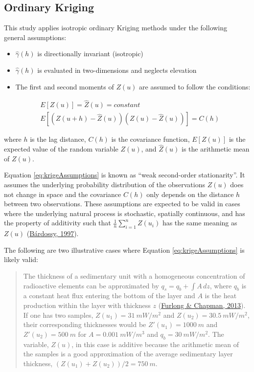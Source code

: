 \hypertarget{ordinary-kriging}{%
\subsection{Ordinary Kriging}\label{ordinary-kriging}}

This study applies isotropic ordinary Kriging methods under the following general assumptions:

\begin{itemize}
\tightlist
\item
  \(\hat{\gamma}(h)\) is directionally invariant (isotropic)
\item
  \(\hat{\gamma}(h)\) is evaluated in two-dimensions and neglects elevation
\item
  The first and second moments of \(Z(u)\) are assumed to follow the conditions:
\end{itemize}

\begin{equation}
  \begin{aligned}
    &E[Z(u)] = \hat{Z}(u) = constant \\
    &E[(Z(u + h) - \hat{Z}(u))(Z(u) - \hat{Z}(u))] = C(h)
  \end{aligned}
  \label{eq:krigeAssumptions}
\end{equation}

where \(h\) is the lag distance, \(C(h)\) is the covariance function, \(E[Z(u)]\) is the expected value of the random variable \(Z(u)\), and \(\hat{Z}(u)\) is the arithmetic mean of \(Z(u)\).

Equation \eqref{eq:krigeAssumptions} is known as ``weak second-order stationarity''. It assumes the underlying probability distribution of the observations \(Z(u)\) does not change in space and the covariance \(C(h)\) only depends on the distance \(h\) between two observations. These assumptions are expected to be valid in cases where the underlying natural process is stochastic, spatially continuous, and has the property of additivity such that \(\frac{1}{n}\sum_{i=1}^n Z(u_i)\) has the same meaning as \(Z(u)\) (\protect\hyperlink{ref-bardossy1997}{Bárdossy, 1997}).

The following are two illustrative cases where Equation \eqref{eq:krigeAssumptions} is likely valid:

\begin{quote}
The thickness of a sedimentary unit with a homogeneous concentration of radioactive elements can be approximated by \(q_s = q_b + \int A \,dz\), where \(q_b\) is a constant heat flux entering the bottom of the layer and \(A\) is the heat production within the layer with thickness \(z\) (\protect\hyperlink{ref-furlong2013}{Furlong \& Chapman, 2013}). If one has two samples, \(Z(u_1) = 31~mW/m^2\) and \(Z(u_2) = 30.5~mW/m^2\), their corresponding thicknesses would be \(Z'(u_1) = 1000~m\) and \(Z'(u_2) = 500~m\) for \(A = 0.001~mW/m^3\) and \(q_b = 30~mW/m^2\). The variable, \(Z(u)\), in this case is additive because the arithmetic mean of the samples is a good approximation of the average sedimentary layer thickness, \((Z(u_1) + Z(u_2)) / 2 = 750~m\).
\end{quote}


